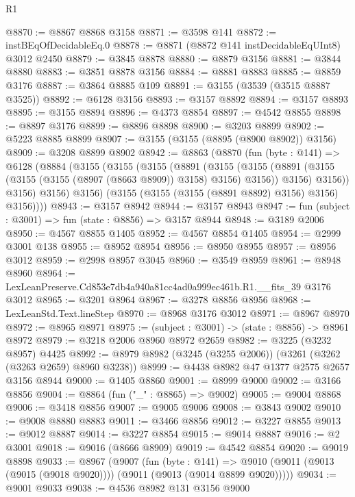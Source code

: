 \begin{lexlean}{R1}
\begin{coremodule}
@8870 := @8867 @8868 @3158
@8871 := @3598 @141
@8872 := instBEqOfDecidableEq.{0}
@8878 := @8871 (@8872 @141 instDecidableEqUInt8) @3012 @2450
@8879 := @3845 @8878
@8880 := @8879 @3156
@8881 := @3844 @8880
@8883 := @3851 @8878 @3156
@8884 := @8881 @8883
@8885 := @8859 @3176
@8887 := @3864 @8885 @109
@8891 := @3155 (@3539 (@3515 @8887 @3525))
@8892 := @6128 @3156
@8893 := @3157 @8892
@8894 := @3157 @8893
@8895 := @3155 @8894
@8896 := @4373 @8854
@8897 := @4542 @8855
@8898 := @8897 @3176
@8899 := @8896 @8898
@8900 := @3203 @8899
@8902 := @5223 @8885 @8899
@8907 := @3155 (@3155 (@8895 (@8900 @8902)) @3156)
@8909 := @3208 @8899 @8902
@8942 := @8863
    (@8870
      (fun (byte : @141) =>
      @6128
        (@8884
          (@3155
            (@3155
              (@3155
                (@8891
                  (@3155
                    (@3155
                      (@8891 (@3155 (@3155 (@3155 (@8907 (@8663 @8909)) @3158) @3156) @3156))
                      @3156)
                    @3156))
                @3156)
              @3156)
            @3156)
          (@3155 (@3155 (@3155 (@8891 @8892) @3156) @3156) @3156))))
@8943 := @3157 @8942
@8944 := @3157 @8943
@8947 := fun (subject : @3001) => fun (state : @8856) => @3157 @8944
@8948 := @3189 @2006
@8950 := @4567 @8855 @1405
@8952 := @4567 @8854 @1405
@8954 := @2999 @3001 @138
@8955 := @8952 @8954
@8956 := @8950 @8955
@8957 := @8956 @3012
@8959 := @2998 @8957 @3045
@8960 := @3549 @8959
@8961 := @8948 @8960
@8964 := LexLeanPreserve.Cd853e7db4a940a81cc4ad0a999ec461b.R1.__fits_39 @3176 @3012
@8965 := @3201 @8964
@8967 := @3278 @8856 @8956
@8968 := LexLeanStd.Text.lineStep
@8970 := @8968 @3176 @3012
@8971 := @8967 @8970
@8972 := @8965 @8971
@8975 := (subject : @3001) -> (state : @8856) -> @8961 @8972
@8979 := @3218 @2006 @8960 @8972 @2659
@8982 := @3225 (@3232 @8957) @4425
@8992 := @8979 @8982 (@3245 (@3255 @2006)) (@3261 (@3262 (@3263 @2659) @8960 @3238))
@8999 := @4438 @8982 @47 @1377 @2575 @2657 @3156 @8944
@9000 := @1405 @8860
@9001 := @8999 @9000
@9002 := @3166 @8856
@9004 := @8864 (fun ("_" : @8865) => @9002)
@9005 := @9004 @8868
@9006 := @3418 @8856
@9007 := @9005 @9006
@9008 := @3843 @9002
@9010 := @9008 @8880 @8883
@9011 := @3466 @8856
@9012 := @3227 @8855
@9013 := @9012 @8887
@9014 := @3227 @8854
@9015 := @9014 @8887
@9016 := @2 @3001
@9018 := @9016 (@8666 @8909)
@9019 := @4542 @8854
@9020 := @9019 @8898
@9033 := @8967
    (@9007
      (fun (byte : @141) =>
      @9010 (@9011 (@9013 (@9015 (@9018 @9020)))) (@9011 (@9013 (@9014 @8899 @9020)))))
@9034 := @9001 @9033
@9038 := @4536 @8982 @131 @3156 @9000

\end{coremodule}
\end{lexlean}

